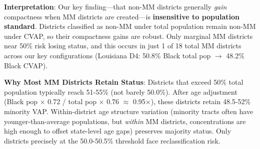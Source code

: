 \bigskip

\noindent\textbf{Interpretation}: Our key finding---that non-MM districts generally \emph{gain} compactness when MM districts are created---is \textbf{insensitive to population standard}. Districts classified as non-MM under total population remain non-MM under CVAP, so their compactness gains are robust. Only marginal MM districts near 50\% risk losing status, and this occurs in just 1 of 18 total MM districts across our key configurations (Louisiana D4: 50.8\% Black total pop $\to$ 48.2\% Black CVAP).

\bigskip

\noindent\textbf{Why Most MM Districts Retain Status}: Districts that exceed 50\% total population typically reach 51-55\% (not barely 50.0\%). After age adjustment (Black pop $\times$ 0.72 / total pop $\times$ 0.76 $\approx$ 0.95×), these districts retain 48.5-52\% minority VAP. Within-district age structure variation (minority tracts often have younger-than-average populations, but \emph{within} MM districts, concentrations are high enough to offset state-level age gaps) preserves majority status. Only districts precisely at the 50.0-50.5\% threshold face reclassification risk.